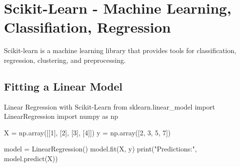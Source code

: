\section{Scikit-Learn - Machine Learning, Classifiation, Regression}
Scikit-learn is a machine learning library that provides tools for classification, regression, clustering, and preprocessing.

\subsection{Fitting a Linear Model}

\begin{codeonly}{Linear Regression with Scikit-Learn}
from sklearn.linear_model import LinearRegression
import numpy as np

X = np.array([[1], [2], [3], [4]])
y = np.array([2, 3, 5, 7])

model = LinearRegression()
model.fit(X, y)
print("Predictions:", model.predict(X))
\end{codeonly}

